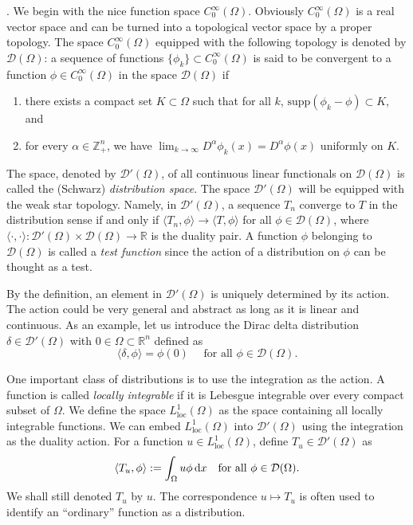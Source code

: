 \vskip0.5cm.
We begin with the nice function space $C_0^{\infty}(\Omega)$. Obviously
$C_0^{\infty}(\Omega)$ is a real vector space and can be turned into a topological vector space
by a proper topology. The space $C_0^{\infty}(\Omega)$ equipped with the following topology is denoted
by $\mathcal D(\Omega)$: a sequence of functions $\{\phi_k\}\subset C_0^{\infty}(\Omega)$ is said to be convergent to a function
$\phi\in C_0^{\infty}(\Omega)$ in the space $\mathcal D(\Omega)$ if
\begin{enumerate}
\item there exists a compact set $K\subset\Omega$
 such that for all $k$, $\textrm{supp}(\phi_k-\phi) \subset K$, and
\item for every $\alpha\in\mathbb Z_+^n$, we have $\lim_{k\to\infty}D^{\alpha}\phi_k(x) = D^{\alpha}\phi(x)$ uniformly on $K$.
\end{enumerate}

The space, denoted by $\mathcal D'(\Omega)$, of all continuous linear functionals on $\mathcal D(\Omega)$ is called the (Schwarz) {\it distribution space}. The space $\mathcal D'(\Omega)$ will be equipped with the weak star
topology. Namely, in $\mathcal D'(\Omega)$, a sequence $T_n$ converge to $T$ in the distribution sense if and only if $\langle T_n, \phi\rangle\to\langle T, \phi\rangle$ for all $\phi\in\mathcal D(\Omega)$, where $\langle\cdot, \cdot\rangle: \mathcal D'(\Omega)\times \mathcal D(\Omega)\to\mathbb R$ is the
duality pair. A function $\phi$ belonging to $\mathcal D(\Omega)$ is called a {\it test function} since the action of a
distribution on $\phi$ can be thought as a test.

\begin{exm}\label{exm:diracdelta}
By the definition, an element in $\mathcal D'(\Omega)$ is uniquely determined by its action.
The action could be very general and abstract as long as it is linear and continuous. As an example, let us introduce the Dirac delta distribution $\delta\in\mathcal D'(\Omega)$ with $0\in\Omega\subset\mathbb R^n$ defined
as
\[
\langle \delta, \phi\rangle = \phi(0) \quad\textrm{ for all } \phi\in \mathcal D(\Omega).
\]
\end{exm}

One important class of distributions is to use the integration as the action. A function
is called {\it locally integrable} if it is Lebesgue integrable over every compact subset of $\Omega$.
We define the space $L^1_{\textrm{loc}}(\Omega)$ as the space containing all locally integrable functions. We
can embed $L^1_{\textrm{loc}}(\Omega)$ into $\mathcal D'(\Omega)$ using the integration as the duality action. For a function
$u\in L^1_{\textrm{loc}}(\Omega)$, define $T_u\in\mathcal D'(\Omega)$ as
\[
\langle T_u, \phi\rangle:=\int_{\Omega}u\phi\,{\rm d}x\quad \textrm{for all }\phi\in\mathcal D(\Omega).
\]
We shall still denoted $T_u$ by $u$. The correspondence $u \mapsto T_u$ is often used to identify an ``ordinary'' function as a distribution.

